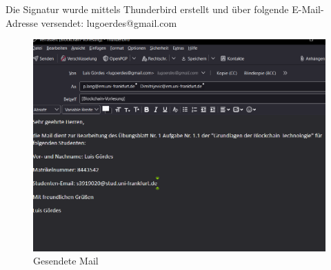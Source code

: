 \documentclass[german]{../uebung}
\begin{document}
\begin{exercise}{1.1}
	Die Signatur wurde mittels Thunderbird erstellt und über folgende E-Mail-Adresse versendet: lugoerdes@gmail.com
	\begin{figure}[h]
		\centering
		\includegraphics*[scale=.5]{Uebungsblatt1.png}
		\caption{Gesendete Mail}
	\end{figure}
\end{exercise}
\end{document}
